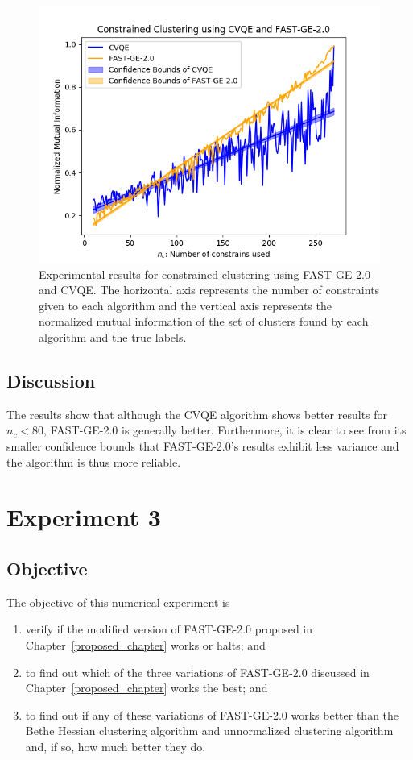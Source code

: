 \begin{figure}[h]
\begin{center}
\includegraphics[width=14cm]{figures/MR.png}
\end{center}
   \caption[Experimental results for constrained clustering using FAST-GE-2.0 and CVQE]{Experimental results for constrained clustering using FAST-GE-2.0 and CVQE. The horizontal axis represents the number of constraints given to each algorithm and the vertical axis represents the normalized mutual information of the set of clusters found by each algorithm and the true labels.}
\label{MR}
\end{figure}

\subsection*{Discussion}
The results show that although the CVQE algorithm shows better results for $n_c < 80$, FAST-GE-2.0 is generally better.
Furthermore, it is clear to see from its smaller confidence bounds that FAST-GE-2.0's results exhibit less variance and the algorithm is thus more reliable.



\section{Experiment 3}
\subsection*{Objective}
The objective of this numerical experiment is
\begin{enumerate}[(1)]
   \item verify if the modified version of FAST-GE-2.0 proposed in Chapter~\ref{proposed_chapter} works or halts; and
   \item to find out which of the three variations of FAST-GE-2.0 discussed in Chapter~\ref{proposed_chapter} works the best; and
   \item to find out if any of these variations of FAST-GE-2.0 works better than the Bethe Hessian clustering algorithm and unnormalized clustering algorithm and, if so, how much better they do.
\end{enumerate}
